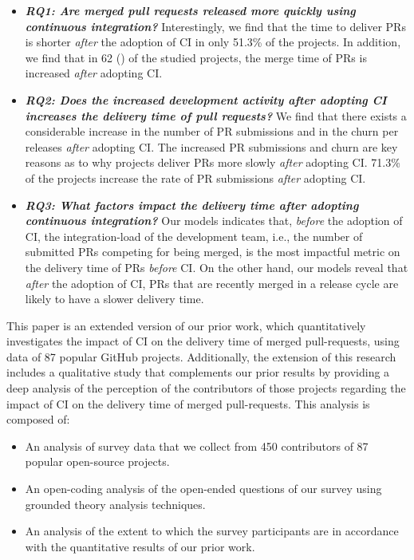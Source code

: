 	\begin{itemize}
		\item \textit{\textbf{RQ1: Are merged pull requests released more quickly using
				continuous integration?}} Interestingly, we find that  the time to
		deliver PRs is shorter \textit{after} the adoption of CI in
		only 51.3\% of the projects. In addition, we find that in 62
		() of the studied projects, the merge time of
		PRs is increased \textit{after} adopting CI.
		
		\item \textit{\textbf{RQ2: Does the increased development activity
				\textit{after} adopting CI increases the delivery time of pull
				requests?}} We find that there exists a considerable increase in the
		number of PR submissions and in the churn per releases
		\textit{after} adopting CI. The increased PR submissions and
		churn are key reasons as to why projects deliver PRs more
		slowly \textit{after} adopting CI. 71.3\% of the projects
		increase the rate of PR submissions {\em after} adopting CI. 
		
		\item \textit{\textbf{RQ3: What factors impact the delivery time
				\textit{after} adopting continuous integration?}} Our models indicates
		that, \textit{before} the adoption of CI, the integration-load
		of the development team, i.e., the number of submitted PRs
		competing for being merged, is the most impactful metric on the
		delivery time of PRs \textit{before} CI. On the other hand, our
		models reveal that \textit{after} the adoption of CI, PRs that
		are recently merged in a release cycle are likely to have a
		slower delivery time.
	\end{itemize}

	This paper is an extended version of our prior work, which quantitatively investigates the impact of CI on the delivery time of merged pull-requests, using data of 87 popular GitHub projects. Additionally, the extension of this research includes a qualitative study that complements our prior results by providing a deep analysis of the perception of the contributors of those projects regarding the impact of CI on the delivery time of merged pull-requests. This analysis is composed of:
	
	\begin{itemize}
		\item An analysis of survey data that we collect from 450 contributors of 87 popular open-source projects.
		\item An open-coding analysis of the open-ended questions of our survey using grounded theory analysis techniques.
		\item An analysis of the extent to which the survey participants are in accordance with the quantitative results of our prior work.
	\end{itemize}
	
